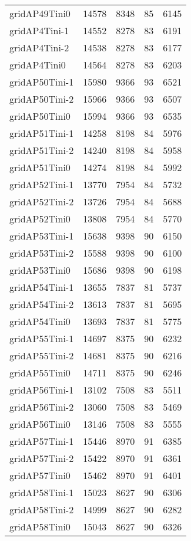 \begin{longtable}{lrrrr}
gridAP49Tini0 & 14578 & 8348 & 85 & 6145 \\
gridAP4Tini-1 & 14552 & 8278 & 83 & 6191 \\
gridAP4Tini-2 & 14538 & 8278 & 83 & 6177 \\
gridAP4Tini0 & 14564 & 8278 & 83 & 6203 \\
gridAP50Tini-1 & 15980 & 9366 & 93 & 6521 \\
gridAP50Tini-2 & 15966 & 9366 & 93 & 6507 \\
gridAP50Tini0 & 15994 & 9366 & 93 & 6535 \\
gridAP51Tini-1 & 14258 & 8198 & 84 & 5976 \\
gridAP51Tini-2 & 14240 & 8198 & 84 & 5958 \\
gridAP51Tini0 & 14274 & 8198 & 84 & 5992 \\
gridAP52Tini-1 & 13770 & 7954 & 84 & 5732 \\
gridAP52Tini-2 & 13726 & 7954 & 84 & 5688 \\
gridAP52Tini0 & 13808 & 7954 & 84 & 5770 \\
gridAP53Tini-1 & 15638 & 9398 & 90 & 6150 \\
gridAP53Tini-2 & 15588 & 9398 & 90 & 6100 \\
gridAP53Tini0 & 15686 & 9398 & 90 & 6198 \\
gridAP54Tini-1 & 13655 & 7837 & 81 & 5737 \\
gridAP54Tini-2 & 13613 & 7837 & 81 & 5695 \\
gridAP54Tini0 & 13693 & 7837 & 81 & 5775 \\
gridAP55Tini-1 & 14697 & 8375 & 90 & 6232 \\
gridAP55Tini-2 & 14681 & 8375 & 90 & 6216 \\
gridAP55Tini0 & 14711 & 8375 & 90 & 6246 \\
gridAP56Tini-1 & 13102 & 7508 & 83 & 5511 \\
gridAP56Tini-2 & 13060 & 7508 & 83 & 5469 \\
gridAP56Tini0 & 13146 & 7508 & 83 & 5555 \\
gridAP57Tini-1 & 15446 & 8970 & 91 & 6385 \\
gridAP57Tini-2 & 15422 & 8970 & 91 & 6361 \\
gridAP57Tini0 & 15462 & 8970 & 91 & 6401 \\
gridAP58Tini-1 & 15023 & 8627 & 90 & 6306 \\
gridAP58Tini-2 & 14999 & 8627 & 90 & 6282 \\
gridAP58Tini0 & 15043 & 8627 & 90 & 6326 \\

\end{longtable}
